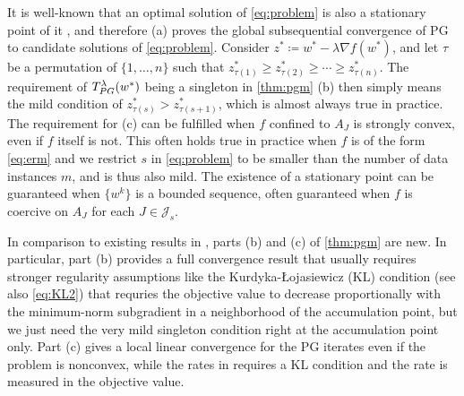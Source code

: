 \documentclass{article}
\newcommand{\alert}[1]{{#1}}
\newcommand{\alertt}[1]{{#1}}
\theoremstyle{plain}
\theoremstyle{definition}
\theoremstyle{remark}
\newtheorem{remark}[theorem]{Remark}
\newcommand{\J}{\mathcal{J}}
\newcommand\inner[2]{\left\langle #1, #2 \right\rangle}
\newcommand{\Tpg}{T_{\rm PG}^{\lambda}}
\DeclareMathOperator*{\argmin}{arg\,min}
\begin{document}

	It is well-known that an optimal solution of \cref{eq:problem} is
	also a
	stationary point of it \cite[Theorem 2.2]{BE13}, and therefore (a) proves the 
	global subsequential convergence of PG to candidate solutions of 
	\cref{eq:problem}. Consider $z^* \coloneqq w^* - \lambda \nabla f(w^*)$,
	and let $\tau$ be a permutation of $\{1,\dotsc,n\}$ such that
	$z^*_{\tau(1)} \geq z^*_{\tau(2)} \geq \cdots \geq z^*_{\tau(n)}$.
	The requirement of $\Tpg (w ^*)$ being a singleton in
	\cref{thm:pgm} (b) then simply means the mild condition of
	$z^*_{\tau(s)} > z^*_{\tau(s+1)}$, which is almost always true in
	practice.
	The requirement for (c) can be fulfilled when $f$ confined to $A_J$ is
	strongly convex, even if $f$ itself is not.
	This often holds true in practice when $f$ is of the form
	\cref{eq:erm} and we restrict $s$ in \cref{eq:problem} to be
	smaller than the number of data instances $m$, and is thus also mild.
	The existence of a stationary point can be guaranteed when $\{w^k\}$
	is a bounded sequence, often guaranteed when $f$ is coercive on
	$A_J$ for each $J \in \J_s$. 

In comparison to existing results in \cite{BKM16,HA13a,BolSTV18a},
parts (b) and (c) of \cref{thm:pgm} are new.
In particular, part (b) provides a full convergence result that usually
requires stronger regularity assumptions like the
Kurdyka-{\L}ojasiewicz (KL) condition \cite{HA13a,BolSTV18a} \alert{(see also 
\cref{eq:KL2})} \alertt{that requries the objective value to decrease
	proportionally with the minimum-norm subgradient in a neighborhood
	of the accumulation point, but we just need the very mild
	singleton condition right at the
accumulation point only}. Part (c) gives a local 
linear convergence for the PG iterates even if the
problem is nonconvex, while the rates in \cite{BolSTV18a} requires a
KL condition and the rate is measured in the objective value.
\end{document}
